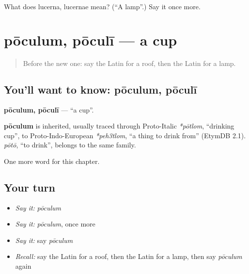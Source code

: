 \begin{tcolorbox}[breakable,colback=teal!4,colframe=teal!35!black,title={Before you move on}]
What does lucerna, lucernae mean? (\textquotedblleft{}A lamp\textquotedblright{}.) Say it once more.
\end{tcolorbox}
\section[pōculum, pōculī]{pōculum, pōculī — a cup}

\label{lesson:LA-C83-poculum}



\begin{quote}
Before the new one: say the Latin for a roof, then the Latin for a lamp.
\end{quote}

\subsection*{You'll want to know: pōculum, pōculī}
\textbf{pōculum, pōculī} — \textquotedblleft{}a cup\textquotedblright{}.

\begin{cousinweb}
\textbf{pōculum} is inherited, usually traced through Proto-Italic \emph{*pōtlom}, \textquotedblleft{}drinking cup\textquotedblright{}, to Proto-Indo-European \emph{*peh3tlom}, \textquotedblleft{}a thing to drink from\textquotedblright{} (EtymDB 2.1). \emph{pōtō}, \textquotedblleft{}to drink\textquotedblright{}, belongs to the same family.
\end{cousinweb}

\begin{grammarlens}[title={What you've built}]
One more word for this chapter.
\end{grammarlens}

\subsection*{Your turn}
\begin{itemize}
\raggedright
  \item \emph{Say it:} \emph{pōculum}
  \item \emph{Say it:} \emph{pōculum}, once more
  \item \emph{Say it:} say \emph{pōculum}
  \item \emph{Recall:} say the Latin for a roof, then the Latin for a lamp, then say \emph{pōculum} again
\end{itemize}

